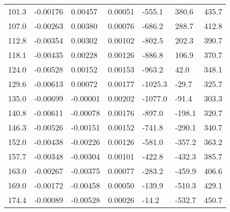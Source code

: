 \begin{table}[htbp]
\begin{tabular}{p{1.5cm}p{1.5cm}p{1.5cm}p{1.5cm}p{1.5cm}p{1.5cm}p{1.5cm}}
    101.3  & -0.00176  & 0.00457  & 0.00051  & -555.1  & 380.6  & 435.7  \\
    107.0  & -0.00263  & 0.00380  & 0.00076  & -686.2  & 288.7  & 412.8  \\
    112.8  & -0.00354  & 0.00302  & 0.00102  & -802.5  & 202.3  & 390.7  \\
    118.1  & -0.00435  & 0.00228  & 0.00126  & -886.8  & 106.9  & 370.7  \\
    124.0  & -0.00528  & 0.00152  & 0.00153  & -963.2  & 42.0  & 348.1  \\
    129.6  & -0.00613  & 0.00072  & 0.00177  & -1025.3  & -29.7  & 325.7  \\
    135.0  & -0.00699  & -0.00001  & 0.00202  & -1077.0  & -91.4  & 303.3  \\
    140.8  & -0.00611  & -0.00078  & 0.00176  & -897.0  & -198.1  & 320.7  \\
    146.3  & -0.00526  & -0.00151  & 0.00152  & -741.8  & -290.1  & 340.7  \\
    152.0  & -0.00438  & -0.00226  & 0.00126  & -581.0  & -357.2  & 363.2  \\
    157.7  & -0.00348  & -0.00304  & 0.00101  & -422.8  & -432.3  & 385.7  \\
    163.0  & -0.00267  & -0.00375  & 0.00077  & -283.2  & -459.9  & 406.6  \\
    169.0  & -0.00172  & -0.00458  & 0.00050  & -139.9  & -510.3  & 429.1  \\
    174.4  & -0.00089  & -0.00528  & 0.00026  & -14.2  & -532.7  & 450.7  \\
    \bottomrule
    \end{tabular}%
  \label{Tab:stress_strain_7046}%
\end{table}%

